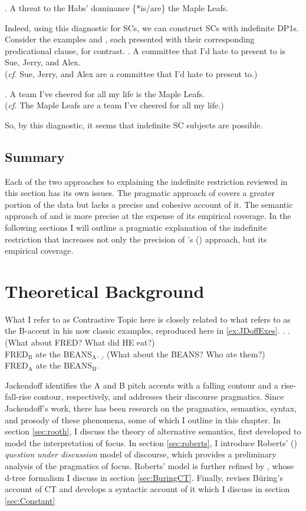 \documentclass[
	letterpaper,
]{article}
\begin{document}
\ex. A threat to the Habs' dominance \{*is/are\} the Maple Leafs.

Indeed, using this diagnostic for SCs, we can construct SCs with indefinite DP1s.
Consider the examples \Next and \NNext, each presented with their corresponding predicational clause, for contrast.
\ex. A committee that I'd hate to present to is Sue, Jerry, and Alex.\\
(\textit{cf.} Sue, Jerry, and Alex are a committee that I'd hate to present to.)

\ex. A team I've cheered for all my life is the Maple Leafs.\\
(\textit{cf.} The Maple Leafs are a team I've cheered for all my life.)

So, by this diagnostic, it seems that indefinite SC subjects are possible.
\subsection{Summary}
Each of the two approaches to explaining the indefinite restriction reviewed in this section has its own issues.
The pragmatic approach of \textcite{mikkelsen2005copular} covers a greater portion of the data but lacks a precise and cohesive account of it.
The semantic approach of \textcite{heycockkroch1999pseudocleft} and \textcite{heycock2012specification} is more precise at the expense of its empirical coverage.
In the following sections I will outline a pragmatic explanation of the indefinite restriction that increases not only the precision of \citeauthor{mikkelsen2005copular}'s (\citeyear{mikkelsen2005copular}) approach, but its empirical coverage.
\section{Theoretical Background}\label{sec:TheoryBackground}
What I refer to as Contrastive Topic here is closely related to what \textcite{jackendoff1972semantics} refers to as the B-accent in his now classic examples, reproduced here in \ref{ex:JDoffExes}.
\ex.\label{ex:JDoffExes}
\a. (What about FRED? What did HE eat?)\\
FRED$_{\text{B}}$ ate the BEANS$_{\text{A}}$.
\b. (What about the BEANS? Who ate them?)\\
FRED$_{\text{A}}$ ate the BEANS$_{\text{B}}$.\hfill\parencite[261]{jackendoff1972semantics}

Jackendoff identifies the A and B pitch accents with a falling contour and a rise-fall-rise contour, respectively, and addresses their discourse pragmatics.
Since Jackendoff's work, there has been research on the pragmatics, semantics, syntax, and prosody of these phenomena, some of which I outline in this chapter.
In section \ref{sec:rooth}, I discuss the theory of alternative semantics, first developed to model the interpretation of focus.
In section \ref{sec:roberts}, I introduce Roberts' (\citeyear{roberts2012information}) \textit{question under discussion} model of discourse, which provides a preliminary analysis of the pragmatics of focus.
Roberts' model is further refined by \textcite{buring2003d}, whose d-tree formalism I discuss in section \ref{sec:BuringCT}.
Finally, \textcite{constant2014diss} revises B\"uring's account of CT and develops a syntactic account of it which I discuss in section \ref{sec:Constant}
\end{document}

